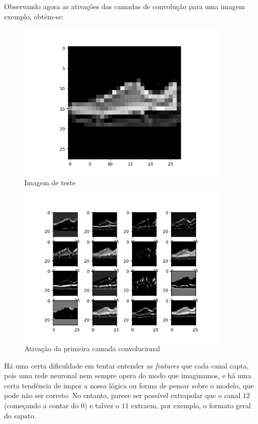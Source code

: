 \documentclass[a4paper,2pt]{report}
\begin{document}
    \par Observando agora as ativações das camadas de convolução para uma imagem exemplo, obtém-se:
    \begin{figure}[H]
        \centering
        \includegraphics[width=4in]{activ_input.png}
        \caption{Imagem de teste}
    \end{figure}
    \begin{figure}[H]
        \centering
        \includegraphics[width=4in]{activ_layer1.png}
        \caption{Ativação da primeira camada convolucional}
    \end{figure}

    \par Há uma certa dificuldade em tentar entender as \textit{features} que cada canal capta, pois uma rede neuronal nem sempre opera do modo que imaginamos, e há uma certa tendência de impor a nossa lógica ou forma de pensar sobre o modelo, que pode não ser correto. No entanto, parece ser possível extrapolar que o canal \(12\) (começando a contar do \(0\)) e talvez o \(11\) extraem, por exemplo, o formato geral do sapato.
\end{document}
